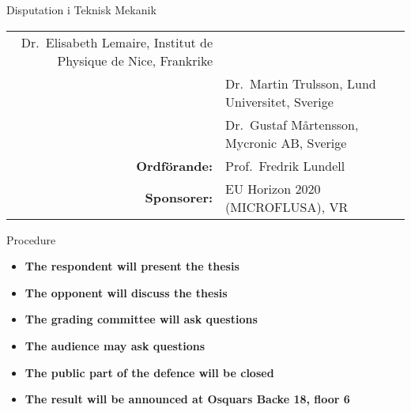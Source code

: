 \begin{frame}[plain]{Disputation i Teknisk Mekanik}
\begin{longtable}[]{@{}rl@{}}
\begin{minipage}[t]{0.72\columnwidth}
    Dr.~Elisabeth Lemaire, Institut de Physique de Nice, Frankrike\strut
  \end{minipage}\tabularnewline
  \begin{minipage}[t]{0.22\columnwidth}\raggedleft
    \strut
  \end{minipage} & \begin{minipage}[t]{0.72\columnwidth}\raggedright
    Dr.~Martin Trulsson, Lund Universitet, Sverige\strut
  \end{minipage}\tabularnewline
  \begin{minipage}[t]{0.22\columnwidth}\raggedleft
    \strut
  \end{minipage} & \begin{minipage}[t]{0.72\columnwidth}\raggedright
    Dr.~Gustaf M\aa rtensson, Mycronic AB, Sverige\strut
  \end{minipage}\tabularnewline
  \begin{minipage}[t]{0.22\columnwidth}\raggedleft
    \textbf{Ordförande:}\strut
  \end{minipage} & \begin{minipage}[t]{0.72\columnwidth}\raggedright
    Prof.~Fredrik Lundell\strut
  \end{minipage}\tabularnewline
  \begin{minipage}[t]{0.22\columnwidth}\raggedleft
    \textbf{Sponsorer:}\strut
  \end{minipage} & \begin{minipage}[t]{0.72\columnwidth}\raggedright
    EU Horizon 2020 (MICROFLUSA), VR\strut
  \end{minipage}\tabularnewline
  \bottomrule
\end{longtable}
\end{frame}

\begin{frame}[plain]{Procedure}
\protect\hypertarget{procedure}{}
\begin{itemize}
\item
  \textbf{The respondent will present the thesis}
  \medskip
\item
  \textbf{The opponent will discuss the thesis}
  \medskip
\item
  \textbf{The grading committee will ask questions}
  \medskip
\item
  \textbf{The audience may ask questions}
  \medskip
\item
  \textbf{The public part of the defence will be closed}
  \medskip
\item
  \textbf{The result will be announced at Osquars Backe 18, floor 6}
\end{itemize}
\end{frame}
